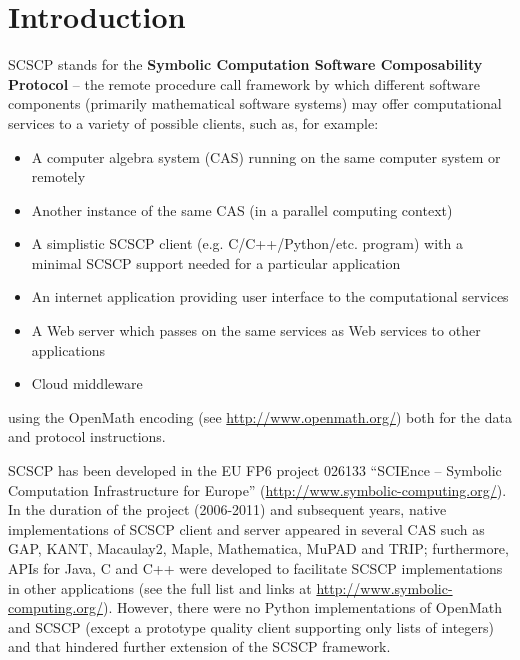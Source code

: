 \documentclass{deliverablereport}
\author{ }
\begin{document}
\maketitle
%
\strut\githubissuedescription
\newpage\tableofcontents\newpage

\section{Introduction}\label{intro}

{\sf SCSCP} stands for the 
{\bf Symbolic Computation Software Composability Protocol}
-- the remote procedure call framework by which different
software components (primarily mathematical software systems) 
may offer computational services to a variety of possible
clients, such as, for example:
\begin{itemize}
\item A computer algebra system (CAS) running on the same computer system or remotely
\item Another instance of the same CAS (in a parallel computing context)
\item A simplistic SCSCP client (e.g. C/C++/Python/etc. program) with a minimal 
SCSCP support needed for a particular application
\item An internet application providing user interface to the computational services
\item A Web server which passes on the same services as Web services to other applications
\item Cloud middleware
\end{itemize}
using the OpenMath encoding (see \url{http://www.openmath.org/})
both for the data and protocol instructions. 

SCSCP has been developed in the EU FP6 project 026133 
``SCIEnce -- Symbolic Computation Infrastructure for Europe''
(\url{http://www.symbolic-computing.org/}).
In the duration of the project (2006-2011) and subsequent
years, native implementations of SCSCP client and server appeared in
several CAS such as GAP, KANT, Macaulay2, Maple, Mathematica, MuPAD
and TRIP; furthermore, APIs for Java, C and C++ were developed
to facilitate SCSCP implementations in other applications
(see the full list and links at \url{http://www.symbolic-computing.org/}).
However, there were no Python implementations of OpenMath and SCSCP 
(except a prototype quality client supporting only lists of integers)
and that hindered further extension of the SCSCP framework.
\end{document}
